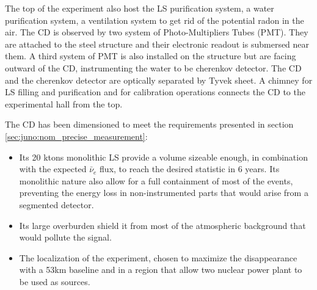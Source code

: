 \documentclass[../main.tex]{subfiles}
\begin{document}
The top of the experiment also host the LS purification system, a water purification system, a ventilation system to get rid of the potential radon in the air.
The CD is observed by two system of Photo-Multipliers Tubes (PMT). They are attached to the steel structure and their electronic readout is submersed near them. A third system of PMT is also installed on the structure but are facing outward of the CD, instrumenting the water to be cherenkov detector. The CD and the cherenkov detector are optically separated by Tyvek sheet. A chimney for LS filling and purification and for calibration operations connects the CD to the experimental hall from the top.

The CD has been dimensioned to meet the requirements presented in section \ref{sec:juno:nom_precise_measurement}:
\begin{itemize}
  \item Its 20 ktons monolithic LS provide a volume sizeable enough, in combination with the expected $\bar{\nu}_e$ flux, to reach the desired statistic in 6 years. Its monolithic nature also allow for a full containment of most of the events, preventing the energy loss in non-instrumented parts that would arise from a segmented detector.
  \item Its large overburden shield it from most of the atmospheric background that would pollute the signal.
  \item The localization of the experiment, chosen to maximize the disappearance with a 53km baseline and in a region that allow two nuclear power plant to be used as sources.
\end{itemize}
\end{document}
